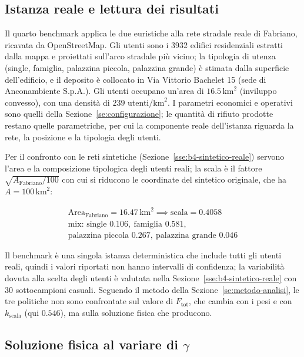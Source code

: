 \subsection{Istanza reale e lettura dei risultati}

Il quarto benchmark applica le due euristiche alla rete stradale reale di Fabriano, ricavata da OpenStreetMap. Gli utenti sono i 3932 edifici residenziali estratti dalla mappa e proiettati sull'arco stradale più vicino; la tipologia di utenza (single, famiglia, palazzina piccola, palazzina grande) è stimata dalla superficie dell'edificio, e il deposito è collocato in Via Vittorio Bachelet 15 (sede di Anconambiente S.p.A.). Gli utenti occupano un'area di $16.5\,\mathrm{km}^2$ (inviluppo convesso), con una densità di $239$ utenti$/\mathrm{km}^2$. I parametri economici e operativi sono quelli della Sezione~\ref{se:configurazione}; le quantità di rifiuto prodotte restano quelle parametriche, per cui la componente reale dell'istanza riguarda la rete, la posizione e la tipologia degli utenti.

Per il confronto con le reti sintetiche (Sezione~\ref{sse:b4-sintetico-reale}) servono l'area e la composizione tipologica degli utenti reali; la scala è il fattore $\sqrt{A_{\text{Fabriano}}/100}$ con cui si riducono le coordinate del sintetico originale, che ha $A=100\,\mathrm{km}^2$:

\begin{gather*}
	\text{Area}_{\text{Fabriano}} = 16.47 \, \text{km}^2 \implies \text{scala} = 0.4058 \\[1ex]
	\text{mix: single } 0.106, \ \text{famiglia } 0.581, \\ \text{palazzina piccola } 0.267, \ \text{palazzina grande } 0.046
\end{gather*}


Il benchmark è una singola istanza deterministica che include tutti gli utenti reali, quindi i valori riportati non hanno intervalli di confidenza; la variabilità dovuta alla scelta degli utenti è valutata nella Sezione~\ref{sse:b4-sintetico-reale} con 30 sottocampioni casuali. Seguendo il metodo della Sezione~\ref{se:metodo-analisi}, le tre politiche non sono confrontate sul valore di $F_{\mathrm{tot}}$, che cambia con i pesi e con $k_{\mathrm{scala}}$ (qui $0.546$), ma sulla soluzione fisica che producono.

\subsection{Soluzione fisica al variare di \texorpdfstring{$\gamma$}{gamma}}\label{sse:b4-fisica}

